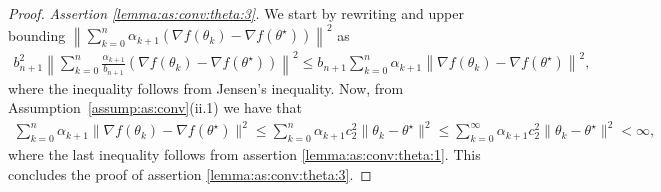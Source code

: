 \documentclass[11pt,a4paper]{article}
\theoremstyle{definition}
\begin{document}
\begin{proof}
\emph{Assertion \ref{lemma:as:conv:theta:3}.} We start by rewriting and upper bounding $\left\|\sum_{k=0}^n \alpha_{k+1} (\nabla {f}(\theta_k) - \nabla{f}(\theta^\star))  \right\|^2$ as
\begin{align*}
    b_{n+1}^2\left\|\sum_{k=0}^n \frac{\alpha_{k+1}}{b_{n+1}}  (\nabla {f}(\theta_k) - \nabla{f}(\theta^\star) ) \right\|^2 \leq b_{n+1}\sum_{k=0}^n \alpha_{k+1}\left\| \nabla {f}(\theta_k) - \nabla{f}(\theta^\star) \right\|^2,
\end{align*}
where the inequality follows from Jensen's inequality. Now, from Assumption~\ref{assump:as:conv}(ii.1) we have that
\begin{align*}
    \sum_{k=0}^n \alpha_{k+1}\|\nabla f(\theta_k) - \nabla f(\theta^\star)\|^2 \leq \sum_{k=0}^n \alpha_{k+1} c_2^2 \|\theta_k - \theta^\star\|^2 \leq \sum_{k=0}^\infty \alpha_{k+1} c_2^2 \|\theta_k - \theta^\star\|^2 < \infty,
\end{align*}
where the last inequality follows from assertion \ref{lemma:as:conv:theta:1}. This concludes the proof of assertion \ref{lemma:as:conv:theta:3}.

\medskip


\end{proof}
\end{document}
